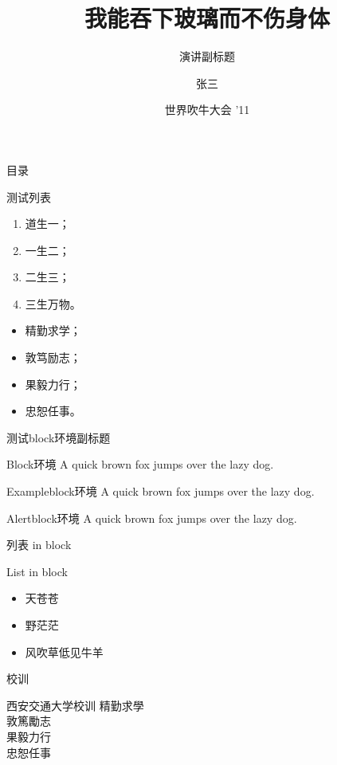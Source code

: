 \documentclass{beamer}
\title{我能吞下玻璃而不伤身体}
\subtitle{演讲副标题} %
\author{张三} %
\institute[Xi'an Jiaotong University] %
{
  西安交通大学
}
\date[Short Occasion] %
{世界吹牛大会 '11}
\begin{document}
\begin{frame}
  \titlepage
\end{frame}

\begin{frame}{目录}
  \tableofcontents %
\end{frame}

\begin{frame}{测试列表}
  \begin{enumerate}
    \item 道生一；
    \item 一生二；
    \item 二生三；
    \item 三生万物。
  \end{enumerate}

  \begin{itemize}
    \item 精勤求学；
    \item 敦笃励志；
    \item 果毅力行；
    \item 忠恕任事。
  \end{itemize}
\end{frame}

\begin{frame}{测试block环境}{副标题}
    \begin{block}{Block环境}
        A quick brown fox jumps over the lazy dog.
    \end{block} \pause

    \begin{exampleblock}{Exampleblock环境}
        A quick brown fox jumps over the lazy dog.
    \end{exampleblock} \pause

    \begin{alertblock}{Alertblock环境}
        A quick brown fox jumps over the lazy dog.
    \end{alertblock} 
\end{frame}

\begin{frame}{列表 in block}
  \begin{exampleblock}{List in block}
    \begin{itemize}
      \item 天苍苍
      \item 野茫茫
      \item 风吹草低见牛羊
    \end{itemize}
  \end{exampleblock}
\end{frame}

\begin{frame}{校训}

    \begin{block}{西安交通大学校训}
        \centering \Huge
        精勤求學
        \\ \pause
        敦篤勵志
        \\ \pause
        果毅力行
        \\ \pause
        忠恕任事
    \end{block}

\end{frame}
\end{document}
